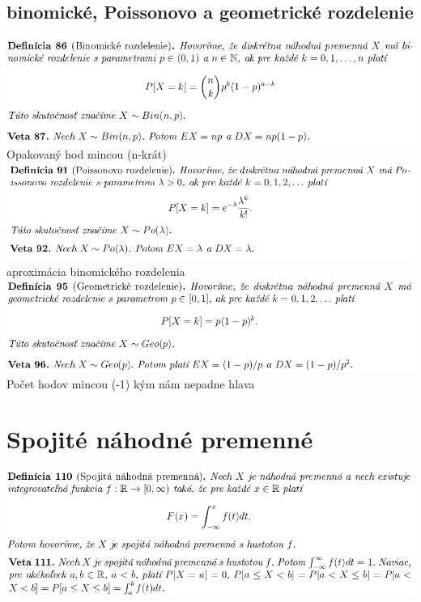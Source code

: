 \subsection {binomické, Poissonovo a geometrické rozdelenie}
\includegraphics[width=1\textwidth]{images/pravdepodobnost/binom_rozd}\\
Opakovaný hod mincou (n-krát)\\
\includegraphics[width=1\textwidth]{images/pravdepodobnost/poiss_rozd}\\
aproximácia binomického rozdelenia\\
\includegraphics[width=1\textwidth]{images/pravdepodobnost/geom_rozd}\\
Počet hodov mincou (-1) kým nám nepadne hlava\\

\section{Spojité náhodné premenné}
\includegraphics[width=1\textwidth]{images/pravdepodobnost/spoj_nah_prem}\\
\includegraphics[width=1\textwidth]{images/pravdepodobnost/spoj_nah_prem_II}\\
